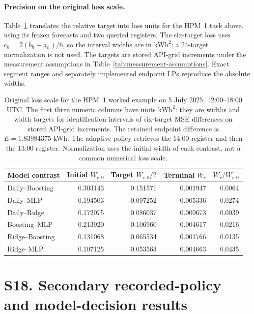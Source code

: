\paragraph{Precision on the original loss scale.}
Table~\ref{tab:absolute_joint_widths} translates the relative target into
loss units for the HPM~1 task above, using its frozen forecasts and two queried
registers. The six-target loss uses $c_h=2(b_h-a_h)/6$, so the interval widths
are in $\mathrm{kWh}^2$; a 24-target normalization is not used. The targets
are stored API-grid increments under the measurement assumptions in
Table~\ref{tab:measurement-assumptions}. Exact segment ranges and separately
implemented endpoint LPs reproduce the absolute widths.
\begin{table}[htbp]
\centering\small
\begin{tabular}{lrrrr}
\toprule
Model contrast & Initial $W_{r,0}$ & Target $W_{r,0}/2$ & Terminal $W_r$ & $W_r/W_{r,0}$\\
\midrule
Daily--Boosting & 0.303143 & 0.151571 & 0.001947 & 0.0064\\
Daily--MLP & 0.194503 & 0.097252 & 0.005336 & 0.0274\\
Daily--Ridge & 0.172075 & 0.086037 & 0.000673 & 0.0039\\
Boosting--MLP & 0.213920 & 0.106960 & 0.004617 & 0.0216\\
Ridge--Boosting & 0.131068 & 0.065534 & 0.001766 & 0.0135\\
Ridge--MLP & 0.107125 & 0.053563 & 0.004663 & 0.0435\\
\bottomrule
\end{tabular}
\caption{Original loss scale for the HPM~1 worked example on 5 July 2025, 12:00--18:00 UTC. The first three numeric columns have units $\mathrm{kWh}^2$: they are widths and width targets for identification intervals of six-target MSE differences on stored API-grid increments. The retained endpoint difference is $E=1.83984375$ kWh. The adaptive policy retrieves the 14:00 register and then the 13:00 register. Normalization uses the initial width of each contrast, not a common numerical loss scale.}
\label{tab:absolute_joint_widths}
\end{table}
\section{S18. Secondary recorded-policy and model-decision results}
